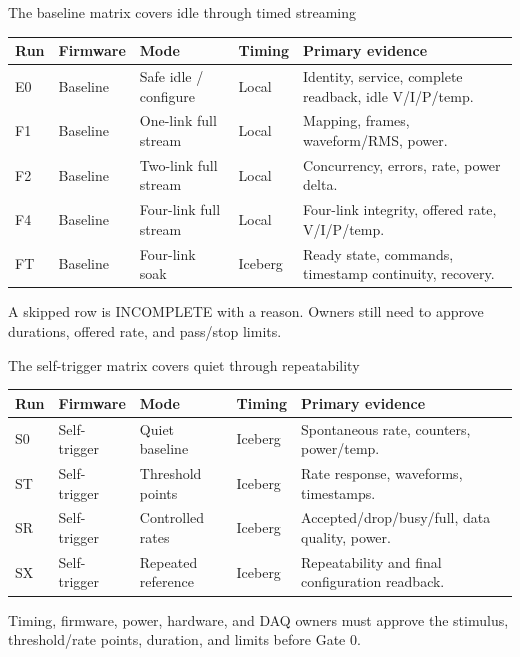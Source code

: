 \documentclass[aspectratio=169,11pt]{beamer}
\begin{document}
\begin{frame}{The baseline matrix covers idle through timed streaming}
  \footnotesize
  \renewcommand{\arraystretch}{1.00}
  \begin{tabularx}{\textwidth}{@{}p{} p{} p{} p{} X@{}}
    \toprule
    Run & Firmware & Mode & Timing & Primary evidence \\
    \midrule
    E0 & Baseline & Safe idle / configure & Local & Identity, service, complete readback, idle V/I/P/temp. \\
    F1 & Baseline & One-link full stream & Local & Mapping, frames, waveform/RMS, power. \\
    F2 & Baseline & Two-link full stream & Local & Concurrency, errors, rate, power delta. \\
    F4 & Baseline & Four-link full stream & Local & Four-link integrity, offered rate, V/I/P/temp. \\
    FT & Baseline & Four-link soak & Iceberg & Ready state, commands, timestamp continuity, recovery. \\
    \bottomrule
  \end{tabularx}

  \smallskip
    {A skipped row is INCOMPLETE with a reason. Owners still need to approve durations, offered rate, and pass/stop limits.}
\end{frame}

\begin{frame}{The self-trigger matrix covers quiet through repeatability}
  \footnotesize
  \renewcommand{\arraystretch}{1.16}
  \begin{tabularx}{\textwidth}{@{}p{} p{} p{} p{} X@{}}
    \toprule
    Run & Firmware & Mode & Timing & Primary evidence \\
    \midrule
    S0 & Self-trigger & Quiet baseline & Iceberg & Spontaneous rate, counters, power/temp. \\
    ST & Self-trigger & Threshold points & Iceberg & Rate response, waveforms, timestamps. \\
    SR & Self-trigger & Controlled rates & Iceberg & Accepted/drop/busy/full, data quality, power. \\
    SX & Self-trigger & Repeated reference & Iceberg & Repeatability and final configuration readback. \\
    \bottomrule
  \end{tabularx}

  \medskip
    {Timing, firmware, power, hardware, and DAQ owners must approve the stimulus, threshold/rate points, duration, and limits before Gate 0.}
\end{frame}
\end{document}
